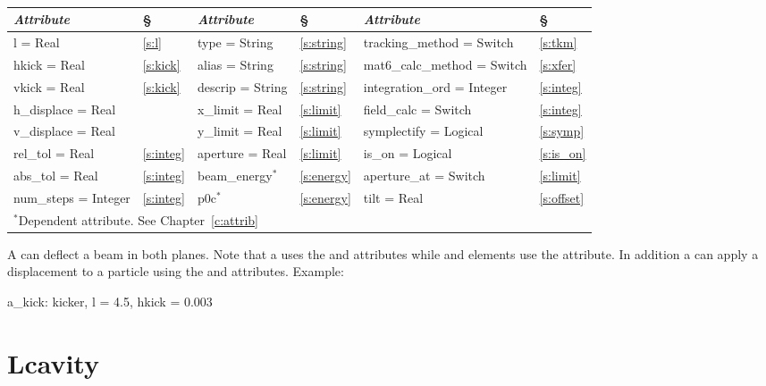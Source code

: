 {{\begin{center}
\tt
\begin{tabular}{|l|l||l|l||l|l|} \hline
  {\sl Attribute} & \S & {\sl Attribute} & \S&  {\sl Attribute} & \S \\ \hline
  l        = Real       & \ref{s:l}       & type = String      & \ref{s:string} & tracking\_method = Switch    & \ref{s:tkm}    \\ \hline
  hkick    = Real       & \ref{s:kick}    & alias = String     & \ref{s:string} & mat6\_calc\_method = Switch  & \ref{s:xfer}   \\ \hline
  vkick    = Real       & \ref{s:kick}    & descrip = String   & \ref{s:string} & integration\_ord = Integer   & \ref{s:integ}  \\ \hline
  h\_displace = Real    &                 & x\_limit = Real    & \ref{s:limit}  & field\_calc = Switch         & \ref{s:integ}  \\ \hline 
  v\_displace = Real    &                 & y\_limit = Real    & \ref{s:limit}  & symplectify = Logical        & \ref{s:symp}   \\ \hline
  rel\_tol = Real       & \ref{s:integ}   & aperture = Real    & \ref{s:limit}  & is\_on = Logical             & \ref{s:is_on}  \\ \hline
  abs\_tol = Real       & \ref{s:integ}   & beam\_energy$^*$   & \ref{s:energy} & aperture\_at = Switch        & \ref{s:limit}  \\ \hline
  num\_steps = Integer  & \ref{s:integ}   & p0c$^*$            & \ref{s:energy} & tilt     = Real              & \ref{s:offset} \\ \hline
  \multicolumn{6}{l}{\small $^*$Dependent attribute. See Chapter~\ref{c:attrib}} \\
\end{tabular}
\end{center}
\toffset

A  can deflect a beam in both planes. Note that a
 uses the  and  attributes while
 and  elements use the  attribute. 
In addition a  can apply a displacement to a particle
using the  and  attributes.
Example:
\begin{example}
  a_kick: kicker, l = 4.5, hkick = 0.003
\end{example}

\section{Lcavity}
\label{s:lcav}

}}
